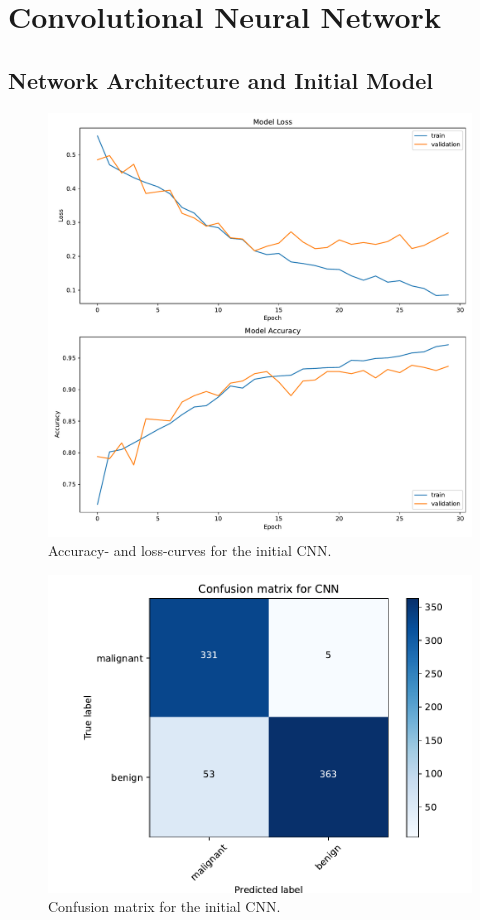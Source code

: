 \chapter{Convolutional Neural Network}
\label{cha:CNN}


\section{Network Architecture and Initial Model}
\label{sec:initialModel}





\begin{figure}[H]
    \centering
    \includegraphics[width=.7\textwidth]{plots/CNN_history.pdf}
    \caption{Accuracy- and loss-curves for the initial CNN.}
    \label{fig:learningCurveInitial}
\end{figure}


\begin{figure}[H]
    \centering
    \includegraphics[width=.5\textwidth]{plots/confusion_matrix_CNN.pdf}
    \caption{Confusion matrix for the initial CNN.}
    \label{fig:confusionMatrixInitial}
\end{figure}



